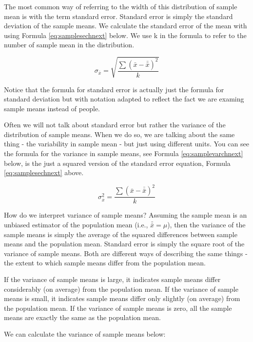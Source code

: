 \documentclass[
]{krantz}
\begin{document}
The most common way of referring to the width of this distribution of sample mean is with the term standard error. Standard error is simply the standard deviation of the sample means. We calculate the standard error of the mean with using Formula \eqref{eq:samplesechnext} below. We use k in the formula to refer to the number of sample mean in the distribution.

\begin{equation} 
\sigma_{\bar{x}} = \sqrt{\frac{\sum{(\bar{x} - \bar{\bar{x}})^2}}{k}}
      \label{eq:samplesechnext}
\end{equation}

Notice that the formula for standard error is actually just the formula for standard deviation but with notation adapted to reflect the fact we are examing sample means instead of people.

Often we will not talk about standard error but rather the variance of the distribution of sample means. When we do so, we are talking about the same thing - the variability in sample mean - but just using different units. You can see the formula for the variance in sample means, see Formula \eqref{eq:samplevarchnext} below, is the just a squared version of the standard error equation, Formula \eqref{eq:samplesechnext} above.

\begin{equation} 
\sigma_{\bar{x}}^2 = \frac{\sum{(\bar{x} - \bar{\bar{x}})^2}}{k}
      \label{eq:samplevarchnext}
\end{equation}

How do we interpret variance of sample means? Assuming the sample mean is an unbiased estimator of the population mean (i.e., \(\bar{\bar{x}} = \mu\)), then the variance of the sample means is simply the average of the squared differences between sample means and the population mean. Standard error is simply the square root of the variance of sample means. Both are different ways of describing the same things - the extent to which sample means differ from the population mean.

If the variance of sample means is large, it indicates sample means differ considerably (on average) from the population mean. If the variance of sample means is small, it indicates sample means differ only slightly (on average) from the population mean. If the variance of sample means is zero, all the sample means are exactly the same as the population mean.

We can calculate the variance of sample means below:
\end{document}
